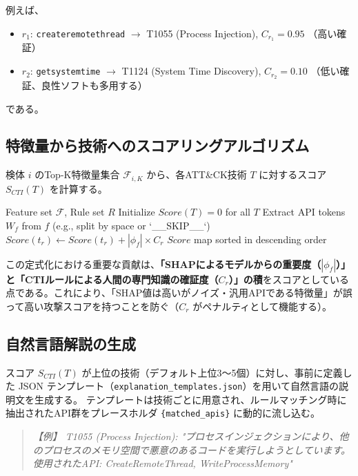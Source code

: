 \documentclass[11pt,a4paper,dvipdfmx]{article}
\begin{document}
例えば、
\begin{itemize}
    \item $r_1$: \texttt{createremotethread} $\rightarrow$ T1055 (Process Injection), $C_{r_1} = 0.95$ （高い確証）
    \item $r_2$: \texttt{getsystemtime} $\rightarrow$ T1124 (System Time Discovery), $C_{r_2} = 0.10$ （低い確証、良性ソフトも多用する）
\end{itemize}
である。

\subsection{特徴量から技術へのスコアリングアルゴリズム}
検体 $i$ のTop-K特徴量集合 $\mathcal{F}_{i,K}$ から、各ATT\&CK技術 $T$ に対するスコア $S_{CTI}(T)$ を計算する。

\begin{algorithm}[H]
\caption{CTI Scoring Algorithm}
\label{alg:cti_score}
\begin{algorithmic}[1]
\REQUIRE Feature set $\mathcal{F}$, Rule set $R$
\STATE Initialize $Score(T) = 0$ for all $T$
    \STATE Extract API tokens $W_f$ from $f$ (e.g., split by space or `\_\_SKIP\_\_`)
            \STATE $Score(t_r) \leftarrow Score(t_r) + |\phi_f| \times C_r$
        \ENDIF
    \ENDFOR
\ENDFOR
\RETURN $Score$ map sorted in descending order
\end{algorithmic}
\end{algorithm}

この定式化における重要な貢献は、\textbf{「SHAPによるモデルからの重要度（$|\phi_f|$）」と「CTIルールによる人間の専門知識の確証度（$C_r$）」の積}をスコアとしている点である。これにより、「SHAP値は高いがノイズ・汎用APIである特徴量」が誤って高い攻撃スコアを持つことを防ぐ（$C_r$ がペナルティとして機能する）。

\subsection{自然言語解説の生成}
スコア $S_{CTI}(T)$ が上位の技術（デフォルト上位3〜5個）に対し、事前に定義した JSON テンプレート（\texttt{explanation\_templates.json}）を用いて自然言語の説明文を生成する。
テンプレートは技術ごとに用意され、ルールマッチング時に抽出されたAPI群をプレースホルダ \texttt{\{matched\_apis\}} に動的に流し込む。
\begin{quote}
\textit{【例】 T1055 (Process Injection): "プロセスインジェクションにより、他のプロセスのメモリ空間で悪意のあるコードを実行しようとしています。使用されたAPI: CreateRemoteThread, WriteProcessMemory"}
\end{quote}
\end{document}
